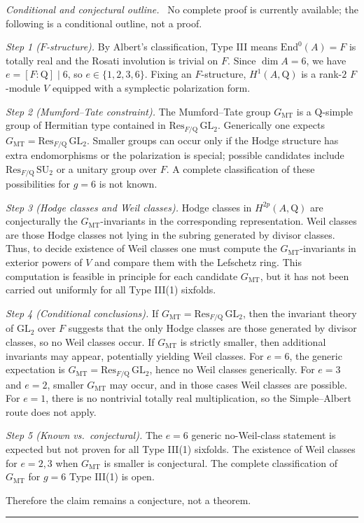 \documentclass{article}
\newcommand{\mathbb}[1]{\mathrm{#1}}
\newenvironment{proof}[1][Proof]{\par\noindent\textit{#1.}\ }{\hfill\rule{1.2ex}{1.2ex}\par}
\begin{document}
\begin{proof}[Conditional and conjectural outline]
No complete proof is currently available; the following is a conditional outline, not a proof.

\emph{Step 1 ($F$-structure).} By Albert's classification, Type III means $\mathrm{End}^0(A) = F$ is totally real and the Rosati involution is trivial on $F$. Since $\dim A = 6$, we have $e = [F:\mathbb{Q}] \mid 6$, so $e \in \{1,2,3,6\}$. Fixing an $F$-structure, $H^1(A,\mathbb{Q})$ is a rank-$2$ $F$-module $V$ equipped with a symplectic polarization form.

\emph{Step 2 (Mumford--Tate constraint).} The Mumford--Tate group $G_{\mathrm{MT}}$ is a $\mathbb{Q}$-simple group of Hermitian type contained in $\mathrm{Res}_{F/\mathbb{Q}}\,\mathrm{GL}_2$. Generically one expects $G_{\mathrm{MT}} = \mathrm{Res}_{F/\mathbb{Q}}\,\mathrm{GL}_2$. Smaller groups can occur only if the Hodge structure has extra endomorphisms or the polarization is special; possible candidates include $\mathrm{Res}_{F/\mathbb{Q}}\,\mathrm{SU}_2$ or a unitary group over $F$. A complete classification of these possibilities for $g = 6$ is not known.

\emph{Step 3 (Hodge classes and Weil classes).} Hodge classes in $H^{2p}(A,\mathbb{Q})$ are conjecturally the $G_{\mathrm{MT}}$-invariants in the corresponding representation. Weil classes are those Hodge classes not lying in the subring generated by divisor classes. Thus, to decide existence of Weil classes one must compute the $G_{\mathrm{MT}}$-invariants in exterior powers of $V$ and compare them with the Lefschetz ring. This computation is feasible in principle for each candidate $G_{\mathrm{MT}}$, but it has not been carried out uniformly for all Type III(1) sixfolds.

\emph{Step 4 (Conditional conclusions).} If $G_{\mathrm{MT}} = \mathrm{Res}_{F/\mathbb{Q}}\,\mathrm{GL}_2$, then the invariant theory of $\mathrm{GL}_2$ over $F$ suggests that the only Hodge classes are those generated by divisor classes, so no Weil classes occur. If $G_{\mathrm{MT}}$ is strictly smaller, then additional invariants may appear, potentially yielding Weil classes. For $e = 6$, the generic expectation is $G_{\mathrm{MT}} = \mathrm{Res}_{F/\mathbb{Q}}\,\mathrm{GL}_2$, hence no Weil classes generically. For $e = 3$ and $e = 2$, smaller $G_{\mathrm{MT}}$ may occur, and in those cases Weil classes are possible. For $e = 1$, there is no nontrivial totally real multiplication, so the Simple--Albert route does not apply.

\emph{Step 5 (Known vs.\ conjectural).} The $e = 6$ generic no-Weil-class statement is expected but not proven for all Type III(1) sixfolds. The existence of Weil classes for $e = 2,3$ when $G_{\mathrm{MT}}$ is smaller is conjectural. The complete classification of $G_{\mathrm{MT}}$ for $g = 6$ Type III(1) is open.

Therefore the claim remains a conjecture, not a theorem.
\end{proof}
\end{document}
